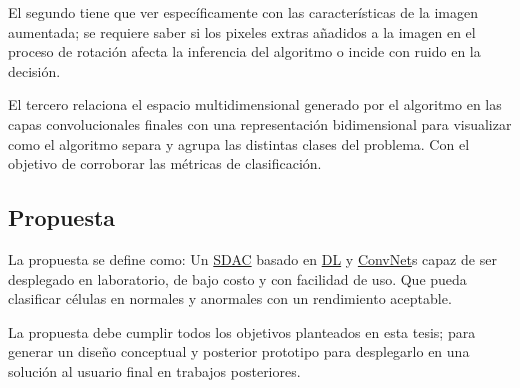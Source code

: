 El segundo tiene que ver específicamente con las características de la imagen
aumentada; se requiere saber si los pixeles extras añadidos a la imagen en el
proceso de rotación afecta la inferencia del algoritmo o incide con ruido en la
decisión.

El tercero relaciona el espacio multidimensional generado por el algoritmo en
las capas convolucionales finales con una representación bidimensional para
visualizar como el algoritmo separa y agrupa las distintas clases del problema.
Con el objetivo de corroborar las métricas de clasificación.

\subsection{Propuesta}

La propuesta se define como: Un \hyperlink{abbr}{SDAC} basado en
\hyperlink{abbr}{DL} y \hyperlink{abbr}{ConvNet}s capaz de ser desplegado en
laboratorio, de bajo costo y con facilidad de uso. Que pueda clasificar células
en normales y anormales con un rendimiento aceptable.

La propuesta debe cumplir todos los objetivos planteados en esta tesis; para
generar un diseño conceptual y posterior prototipo para desplegarlo en una
solución al usuario final en trabajos posteriores.
